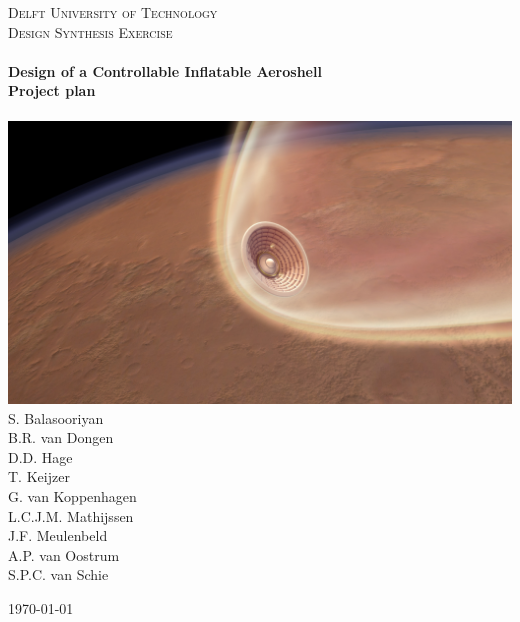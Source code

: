 \begin{titlepage}
\begin{center}

\textsc{\LARGE Delft University of Technology}\\[0.3cm]
\textsc{\Large Design Synthesis Exercise}\\[0.5cm]

\HRule \\[0.4cm]
{\Large \bfseries Design of a Controllable Inflatable Aeroshell}\\[0.2cm]
{\Huge \bfseries Project plan}\\[0.2cm]
\HRule \\[1.2cm]

\includegraphics[scale=0.4]{./Titlepage/coverpicture}\\[1cm]

S. Balasooriyan \\
B.R. van Dongen \\
D.D. Hage \\
T. Keijzer \\
G. van Koppenhagen \\
L.C.J.M. Mathijssen \\
J.F. Meulenbeld \\
A.P. van Oostrum	\\
S.P.C. van Schie \\




\vfill

\begin{large}\today \end{large}

\end{center}
\end{titlepage}